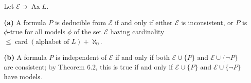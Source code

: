 Let $\mathcal{E} \supset \operatorname{Ax} L$.

\textbf{(a)} A formula $P$ is deducible from $\mathcal{E}$ if and only if either $\mathcal{E}$ is inconsistent, or $P$ is $\phi$-true for all models $\phi$ of the set $\mathcal{E}$ having cardinality $\leqslant \operatorname{card}(\text{alphabet of } L) + \aleph_0$.

\textbf{(b)} A formula $P$ is independent of $\mathcal{E}$ if and only if both $\mathcal{E} \cup \{P\}$ and $\mathcal{E} \cup \{\neg P\}$ are consistent; by Theorem 6.2, this is true if and only if $\mathcal{E} \cup \{P\}$ and $\mathcal{E} \cup \{\neg P\}$ have models.
